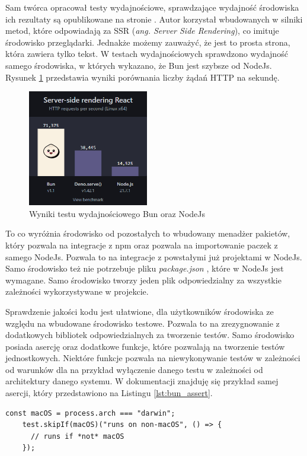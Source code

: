 Sam twórca opracował testy wydajnościowe, sprawdzające wydajność środowiska ich rezultaty są opublikowane na stronie \cite{bun_test}. Autor korzystał wbudowanych w silniki metod, które odpowiadają za SSR (\textit{ang. Server Side Rendering}), co imituje środowisko przeglądarki. Jednakże możemy zauważyć, że jest to prosta strona, która zawiera tylko tekst. W testach wydajnościowych sprawdzono wydajność samego środowiska, w których wykazano, że Bun jest szybsze od NodeJs. Rysunek \ref{fig:bun_bench} przedstawia wyniki porównania liczby żądań HTTP na sekundę.

\begin{figure}[H]
  \centering
  \includegraphics[width=0.47\textwidth]{Figures/bun_bench.png}
  \caption{Wyniki testu wydajnościowego Bun oraz NodeJs \cite{bun_test}}
  \label{fig:bun_bench}
\end{figure}

To co wyróżnia środowisko od pozostałych to wbudowany menadżer pakietów, który pozwala na integracje z npm \cite{npm} oraz pozwala na importowanie paczek z samego NodeJs. Pozwala to na integracje z powstałymi już projektami w NodeJs. Samo środowisko też nie potrzebuje pliku \textit{package.json} \cite{package_structure}, które w NodeJs jest wymagane. Samo środowisko tworzy jeden plik odpowiedzialny za wszystkie zależności wykorzystywane w projekcie.

Sprawdzenie jakości kodu jest ułatwione, dla użytkowników środowiska ze względu na wbudowane środowisko testowe. Pozwala to na zrezygnowanie z dodatkowych bibliotek odpowiedzialnych za tworzenie testów. Samo środowisko posiada asercję oraz dodatkowe funkcje, które pozwalają na tworzenie testów jednostkowych. Niektóre funkcje pozwala na niewykonywanie testów w zależności od warunków dla na przykład wyłączenie danego testu w zależności od architektury danego systemu. W dokumentacji znajduję się przykład samej asercji, który przedstawiono na Listingu \ref{lst:bun_assert}.

\begin{centering}
  \begin{lstlisting}[caption={Przykład asercji w środowisku Bun},label={lst:bun_assert},captionpos=b]
    const macOS = process.arch === "darwin";
    test.skipIf(macOS)("runs on non-macOS", () => {
      // runs if *not* macOS
    });
  \end{lstlisting}
\end{centering}


